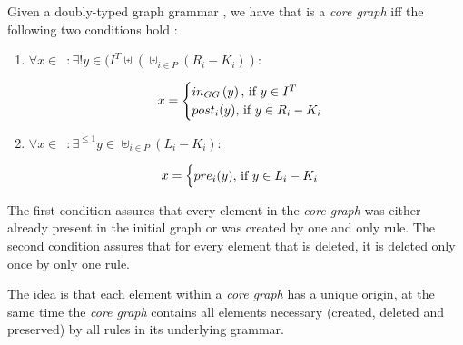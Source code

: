 \begin{definition} Given a doubly-typed graph grammar \doublyTypedGraphGrammarCore{}, we have that \coreGraph{} is a \emph{core graph} iff the following two conditions hold
:

\begin{enumerate}

\item \mbox{$\forall x \in$ \coreGraph $: \exists! y \in (I^T \uplus (\uplus_{i \in P} (R_i - K_i))$}:


\[ x =
    \begin{cases}
      in_{GG}\parens{y},$ if $y \in I^T\\
      post_i(y),$ if $y \in R_i - K_i\\
    \end{cases}
   \]

\item \mbox{$\forall x \in$ \coreGraph $: \exists^{\leq1} y \in \uplus_{i \in P} (L_i - K_i)$}:


\[ x =
    \begin{cases}
      pre_i(y),$ if $y \in L_i - K_i\\
    \end{cases}
   \]\end{enumerate}

  The first condition assures that every element in the \emph{core graph} was either already present in the initial graph or was created by one and only rule. The second condition assures that for every element that is deleted, it is deleted only once by only one rule.

  \begin{intuition} The idea is that each element within a \emph{core graph} has a unique origin, at the same time the \emph{core graph} contains all elements necessary (created, deleted and preserved) by all rules in its underlying grammar.
\end{intuition}


\end{definition}

